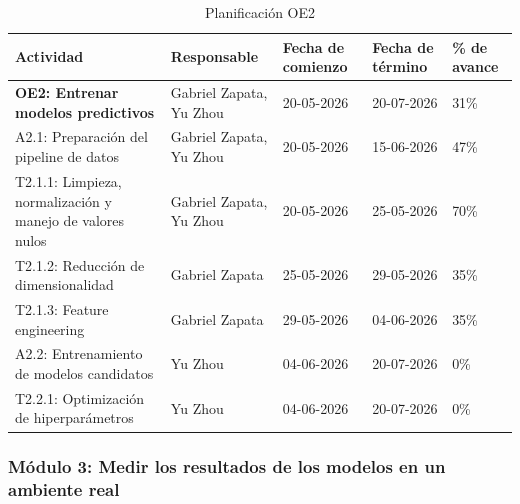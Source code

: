 \documentclass[12pt,a4paper]{article}
\begin{document}
    \begin{table}[H]
            \centering
            \renewcommand{\arraystretch}{1.5}
            \begin{tabular}{|p{5cm}|p{3cm}|p{2cm}|p{2cm}|p{2cm}|}
            \hline
            \textbf{Actividad} & \textbf{Responsable} & \textbf{Fecha de comienzo} & \textbf{Fecha de término} & \textbf{\% de avance} \\ \hline
            \textbf{OE2: Entrenar modelos predictivos} & Gabriel Zapata, Yu Zhou & 20-05-2026 & 20-07-2026 & 31\% \\ \hline
            A2.1: Preparación del pipeline de datos & Gabriel Zapata, Yu Zhou & 20-05-2026 & 15-06-2026 & 47\% \\ \hline
            T2.1.1: Limpieza, normalización y manejo de valores nulos & Gabriel Zapata, Yu Zhou & 20-05-2026 & 25-05-2026 & 70\% \\ \hline
            T2.1.2: Reducción de dimensionalidad & Gabriel Zapata & 25-05-2026 & 29-05-2026 & 35\% \\ \hline
            T2.1.3: Feature engineering & Gabriel Zapata & 29-05-2026 & 04-06-2026 & 35\% \\ \hline
            A2.2: Entrenamiento de modelos candidatos & Yu Zhou & 04-06-2026 & 20-07-2026 & 0\% \\ \hline
            T2.2.1: Optimización de hiperparámetros & Yu Zhou & 04-06-2026 & 20-07-2026 & 0\% \\ \hline
            \end{tabular}
            \caption{Planificación OE2}
            \label{tab:planificacion_avance_oe2}
    \end{table}




    \subsubsection{Módulo 3: Medir los resultados de los modelos en un ambiente real}
\end{document}
